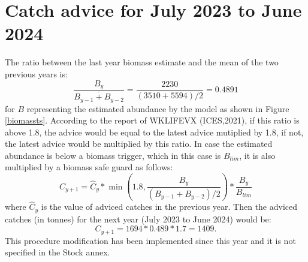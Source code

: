 \documentclass[review]{elsarticle}
\begin{document}
\section{Catch advice for July 2023 to June 2024}
The ratio between the last year biomass estimate and the mean of the two previous years is: $$\frac{B_{y}}{\overline{B_{y-1}+B_{y-2}}}=\frac{2230}{(3510+5594)/2}=0.4891$$ for  $B$ representing the estimated abundance by the model as shown in Figure \ref{biomassts}. According to the report of WKLIFEVX (ICES,2021), if this ratio is above 1.8, the advice would be equal to the latest advice mutiplied by 1.8, if not,  the latest advice would be multiplied by this ratio. In case the estimated abundance is below a biomass trigger, which in this case is $B_{lim}$, it is also multiplied by a biomass safe guard as follows:  $$C_{y+1}=\hat{C}_{y}*\min\left(1.8,\frac{B_{y}}{(B_{y-1}+B_{y-2})/2}\right)*\frac{B_{y}}{B_{lim}}$$ where  $\hat{C}_{y}$ is the value of adviced catches in the previous year. Then the adviced catches (in tonnes) for the next year (July 2023 to June 2024) would be: $$C_{y+1}=1694*0.489*1.7=1409.$$  This procedure modification has been implemented since this year and it is not specified in the Stock annex.







\end{document}

